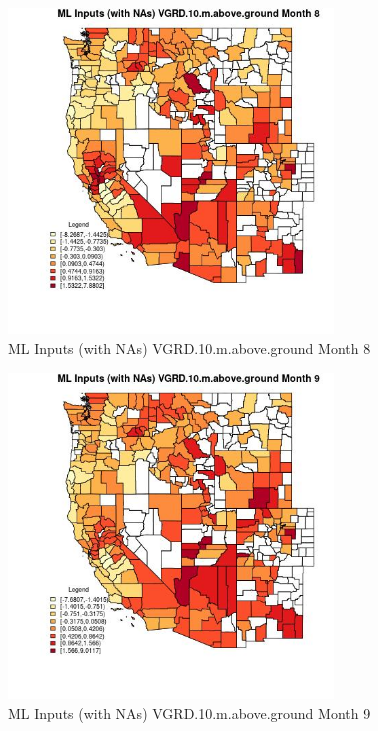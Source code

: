\begin{figure} 
\centering  
\includegraphics[width=0.77\textwidth]{Code_Outputs/Report_ML_input_PM25_Step4_part_f_de_duplicated_aveswNAs_CountyVGRD10mabovegroundmedianMonth8.jpg} 
\caption{\label{fig:Report_ML_input_PM25_Step4_part_f_de_duplicated_aveswNAsCountyVGRD10mabovegroundmedianMonth8}ML Inputs (with NAs) VGRD.10.m.above.ground Month 8} 
\end{figure} 
 

\begin{figure} 
\centering  
\includegraphics[width=0.77\textwidth]{Code_Outputs/Report_ML_input_PM25_Step4_part_f_de_duplicated_aveswNAs_CountyVGRD10mabovegroundmedianMonth9.jpg} 
\caption{\label{fig:Report_ML_input_PM25_Step4_part_f_de_duplicated_aveswNAsCountyVGRD10mabovegroundmedianMonth9}ML Inputs (with NAs) VGRD.10.m.above.ground Month 9} 
\end{figure} 
 

